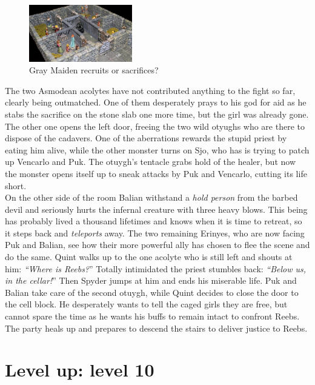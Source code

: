 \begin{figure}[h]
	\centering
	\includegraphics[width=0.4\textwidth]{images/Gray-Maiden-recruits-of-sacrifices-616081293_mod.jpg}
	\caption{Gray Maiden recruits or sacrifices?}
	\label{fig:Gray-Maiden-recruits-of-sacrifices-616081293}
\end{figure}

The two Asmodean acolytes have not contributed anything to the fight so far, clearly being outmatched. One of them desperately prays to his god for aid as he stabs the sacrifice on the stone slab one more time, but the girl was already gone. The other one opens the left door, freeing the two wild otyughs who are there to dispose of the cadavers. One of the aberrations rewards the stupid priest by eating him alive, while the other monster turns on Sjo, who has is trying to patch up Vencarlo and Puk. The otuygh's tentacle grabs hold of the healer, but now the monster opens itself up to sneak attacks by Puk and Vencarlo, cutting its life short.\\

On the other side of the room Balian withstand a {\itshape hold person} from the barbed devil and seriously hurts the infernal creature with three heavy blows. This being has probably lived a thousand lifetimes and knows when it is time to retreat, so it steps back and  {\itshape teleports} away. The two remaining Erinyes, who are now facing Puk and Balian, see how their more powerful ally has chosen to flee the scene and do the same. Quint walks up to the one acolyte who is still left and shouts at him: {\itshape``Where is Reebs?}'' Totally intimidated the priest stumbles back: {\itshape``Below us, in the cellar!}'' Then Spyder jumps at him and ends his miserable life. Puk and Balian take care of the second otuygh, while Quint decides to close the door to the cell block. He desperately wants to tell the caged girls they are free, but cannot spare the time as he wants his buffs to remain intact to confront Reebs. The party heals up and prepares to descend the stairs to deliver justice to Reebs. \section{Level up: level 10}


